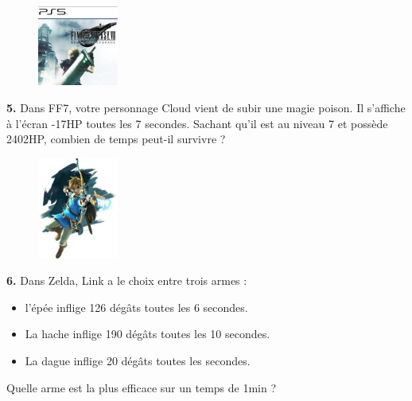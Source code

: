 \Pointilles[7]

\begin{minipage}[t]{0.25\textwidth}
  \begin{figure}[H]
    \centering
    \includegraphics[width=100px]{4x2-nombres-relatifs/ex2.jpg}
  \end{figure}
\end{minipage}
\begin{minipage}[t]{0.75\textwidth}
  \textbf{5.} Dans FF7, votre personnage Cloud vient de subir une magie poison. Il s'affiche à l'écran -17HP toutes les 7 secondes. Sachant qu'il est au niveau 7 et possède 2402HP, combien de temps peut-il survivre ?\\
  \Pointilles[6]
\end{minipage}

\Pointilles[3]

\begin{minipage}[t]{0.25\textwidth}
  \begin{figure}[H]
    \centering
    \includegraphics[width=100px]{4x2-nombres-relatifs/ex3.jpg}
  \end{figure}
\end{minipage}
\begin{minipage}[t]{0.75\textwidth}
  \textbf{6.} Dans Zelda, Link a le choix entre trois armes : 
  \begin{itemize}
    \item l'épée inflige 126 dégâts toutes les 6 secondes.
    \item La hache inflige 190 dégâts toutes les 10 secondes.
    \item La dague inflige 20 dégâts toutes les secondes.
  \end{itemize}
  Quelle arme est la plus efficace sur un temps de 1min ?\\
  \Pointilles[5]
\end{minipage}

